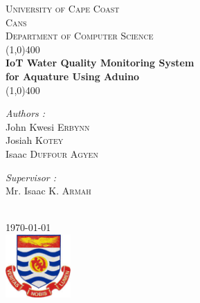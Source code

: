 \documentclass[12pt]{article}
\begin{document}
	\begin{titlepage}
		\begin{center}
			\textsc{\Large University of Cape Coast}\\[1.5cm]
			\textsc{\Large Cans}\\[0.5cm]		%
			\textsc{\large Department of Computer Science}\\[0.5cm]
			\vfill
			\line(1,0){400} \\ [1mm]
			\large{\textbf{ IoT Water Quality Monitoring System }} \\ [3mm]
			\small{\textbf{for Aquature Using Aduino}} \\ [1mm]
			\line(1,0){400} \\ [2cm]
			
			\begin{minipage}{0.4 \textwidth}
				\begin{flushleft} \large
					\emph{Authors : } \\
					John Kwesi \textsc{Erbynn} \\
					Josiah \textsc{Kotey} \\
					Isaac  \textsc{Duffour Agyen}
				\end{flushleft}						
			\end{minipage}
			\begin{minipage}{0.4 \textwidth}
				\begin{flushright} \large
					\emph{Supervisor : } \\
					Mr. Isaac K. \textsc{Armah} \\
				\end{flushright}						
			\end{minipage} \\[2cm]
			
			\small{\today} \\[2cm]
			
			\includegraphics[width=2.5cm]{ucclogo.jpg}\\[1cm]
		\end{center}
	\end{titlepage}		
	
\end{document}
